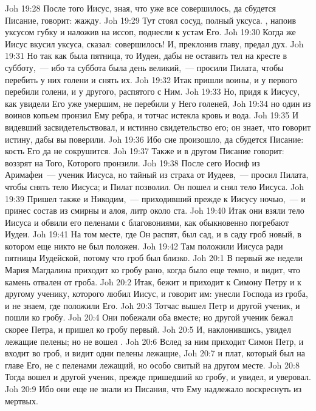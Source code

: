 \rsbpar\vs Joh 19:28 После того Иисус, зная, что уже все совершилось, да сбудется Писание, говорит: жажду.
\vs Joh 19:29 Тут стоял сосуд, полный уксуса. , напоив уксусом губку и наложив на иссоп, поднесли к устам Его.
\vs Joh 19:30 Когда же Иисус вкусил уксуса, сказал: совершилось! И, преклонив главу, предал дух.
\rsbpar\vs Joh 19:31 Но так как  была пятница, то Иудеи, дабы не оставить тел на кресте в субботу,~--- ибо та суббота была день великий,~--- просили Пилата, чтобы перебить у них голени и снять их.
\vs Joh 19:32 Итак пришли воины, и у первого перебили голени, и у другого, распятого с Ним.
\vs Joh 19:33 Но, придя к Иисусу, как увидели Его уже умершим, не перебили у Него голеней,
\vs Joh 19:34 но один из воинов копьем пронзил Ему ребра, и тотчас истекла кровь и вода.
\vs Joh 19:35 И видевший засвидетельствовал, и истинно свидетельство его; он знает, что говорит истину, дабы вы поверили.
\vs Joh 19:36 Ибо сие произошло, да сбудется Писание: кость Его да не сокрушится.
\vs Joh 19:37 Также и в другом  Писание говорит: воззрят на Того, Которого пронзили.
\rsbpar\vs Joh 19:38 После сего Иосиф из Аримафеи~--- ученик Иисуса, но тайный из страха от Иудеев,~--- просил Пилата, чтобы снять тело Иисуса; и Пилат позволил. Он пошел и снял тело Иисуса.
\vs Joh 19:39 Пришел также и Никодим,~--- приходивший прежде к Иисусу ночью,~--- и принес состав из смирны и алоя, литр около ста.
\vs Joh 19:40 Итак они взяли тело Иисуса и обвили его пеленами с благовониями, как обыкновенно погребают Иудеи.
\vs Joh 19:41 На том месте, где Он распят, был сад, и в саду гроб новый, в котором еще никто не был положен.
\vs Joh 19:42 Там положили Иисуса ради пятницы Иудейской, потому что гроб был близко.
\vs Joh 20:1 В первый же  недели Мария Магдалина приходит ко гробу рано, когда было еще темно, и видит, что камень отвален от гроба.
\vs Joh 20:2 Итак, бежит и приходит к Симону Петру и к другому ученику, которого любил Иисус, и говорит им: унесли Господа из гроба, и не знаем, где положили Его.
\vs Joh 20:3 Тотчас вышел Петр и другой ученик, и пошли ко гробу.
\vs Joh 20:4 Они побежали оба вместе; но другой ученик бежал скорее Петра, и пришел ко гробу первый.
\vs Joh 20:5 И, наклонившись, увидел лежащие пелены; но не вошел .
\vs Joh 20:6 Вслед за ним приходит Симон Петр, и входит во гроб, и видит одни пелены лежащие,
\vs Joh 20:7 и плат, который был на главе Его, не с пеленами лежащий, но особо свитый на другом месте.
\vs Joh 20:8 Тогда вошел и другой ученик, прежде пришедший ко гробу, и увидел, и уверовал.
\vs Joh 20:9 Ибо они еще не знали из Писания, что Ему надлежало воскреснуть из мертвых.
